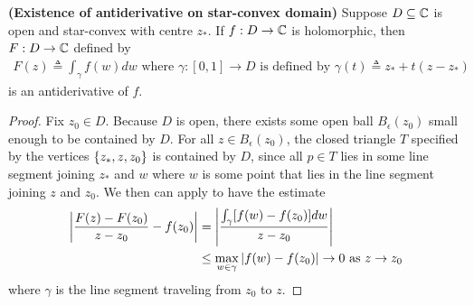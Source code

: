 \documentclass{report}
\begin{document}
\begin{theorem}
\textbf{(Existence of antiderivative on star-convex domain)} Suppose $D\subseteq \mathbb{C}$ is open and star-convex with centre  $z_*$. If $f:D\rightarrow \mathbb{C}$ is holomorphic, then $F:D\rightarrow \mathbb{C}$ defined by 
\begin{align*}
F(z)\triangleq \int_\gamma f(w)dw\text{ where }\gamma :[0,1]\rightarrow D\text{ is defined by }\gamma(t)\triangleq z_*+t(z-z_*)
\end{align*}
is an antiderivative of $f$. 
\end{theorem}
\begin{proof}
Fix $z_0 \in D$. Because $D$ is open, there exists some open ball $B_\epsilon (z_0)$ small enough to be contained by $D$. For all $z\in B_\epsilon (z_0)$, the closed triangle $T$ specified by the vertices $\{ z_*,z,z_0 \}$ is contained by $D$, since all $p\in  T$ lies in some line segment joining $z_*$ and $w$ where $w$ is some point that lies in the line segment joining $z$ and  $z_0$.  We then can apply  to have the estimate 
\begin{align*}
  \left|\frac{F(z)-F(z_0)}{z-z_0}-f(z_0)\right|&= \left|\frac{\int_\gamma [f(w)-f(z_0)]dw}{z-z_0}\right|\\
  &\leq \max_{w \in \gamma }\left|f(w)-f(z_0)\right|\to 0\text{ as }z \to z_0
\end{align*}
where $\gamma$ is the line segment traveling from $z_0$ to  $z$.  
\end{proof}
\end{document}
